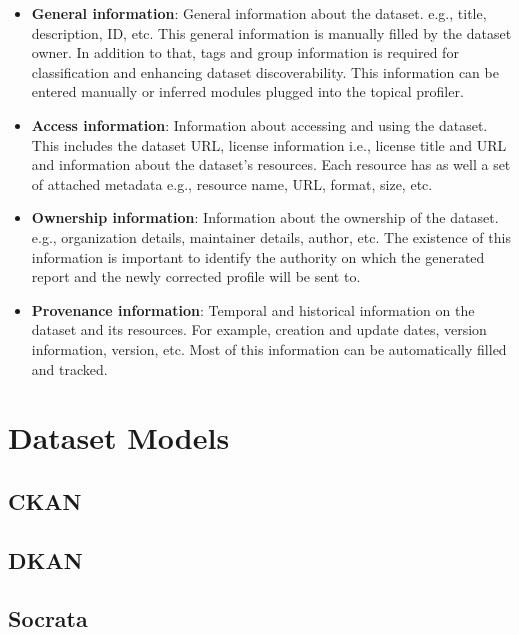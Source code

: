 \documentclass[runningheads,a4paper]{llncs}
\begin{document}
\begin{itemize}
\item \textbf{General information}: General information about the dataset. e.g., title, description, ID, etc. This general information is manually filled by the dataset owner. In addition to that, tags and group information is required for classification and enhancing dataset discoverability. This information can be entered manually or inferred modules plugged into the topical profiler.

\item \textbf{Access information}: Information about accessing and using the dataset. This includes the dataset URL, license information i.e., license title and URL and information about the dataset's resources. Each resource has as well a set of attached metadata e.g., resource name, URL, format, size, etc.

\item \textbf{Ownership information}: Information about the ownership of the dataset. e.g., organization details, maintainer details, author, etc. The existence of this information is important to identify the authority on which the generated report and the newly corrected profile will be sent to.

\item \textbf{Provenance information}: Temporal and historical information on the dataset and its resources. For example, creation and update dates, version information, version, etc. Most of this information can be automatically filled and tracked.
\end{itemize}


\section{Dataset Models}
\label{sec:models}

\subsection{CKAN}

\subsection{DKAN}

\subsection{Socrata}
\end{document}
